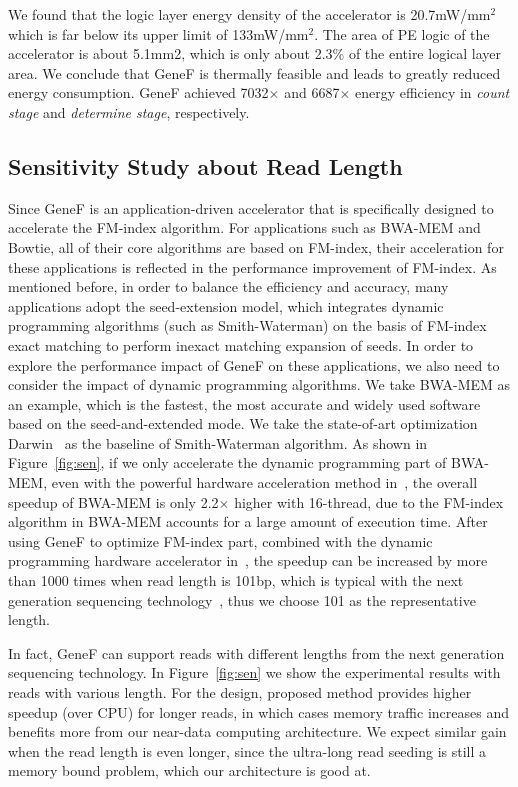 \documentclass[9pt,conference]{IEEEtran}
\begin{document}
We found that the logic layer energy density of the accelerator is 20.7mW/mm$^{2}$ which is far below its upper limit of 133mW/mm$^{2}$. The area of PE logic of the accelerator is about 5.1mm2, which is only about 2.3\% of the entire logical layer area. We conclude that GeneF is thermally feasible and leads to greatly reduced energy consumption. GeneF achieved 7032$\times$ and 6687$\times$ energy efficiency in \textit{count stage} and \textit{determine stage}, respectively.

\subsection{Sensitivity Study about Read Length}
Since GeneF is an application-driven accelerator that is specifically designed to accelerate the FM-index algorithm. For applications such as BWA-MEM and Bowtie, all of their core algorithms are based on FM-index, their acceleration for these applications is reflected in the performance improvement of FM-index. As mentioned before, in order to balance the efficiency and accuracy, many applications adopt the seed-extension model, which integrates dynamic programming algorithms (such as Smith-Waterman) on the basis of FM-index exact matching to perform inexact matching expansion of seeds. In order to explore the performance impact of GeneF on these applications, we also need to consider the impact of dynamic programming algorithms. We take BWA-MEM as an example, which is the fastest, the most accurate and widely used software based on the seed-and-extended mode. We take the state-of-art optimization Darwin~\cite{turakhia2018darwin} as the baseline of Smith-Waterman algorithm. As shown in Figure~\ref{fig:sen}, if we only accelerate the dynamic programming part of BWA-MEM, even with the powerful hardware acceleration method in~\cite{turakhia2018darwin}, the overall speedup of BWA-MEM is only 2.2$\times$ higher with 16-thread, due to the FM-index algorithm in BWA-MEM accounts for a large amount of execution time. After using GeneF to optimize FM-index part, combined with the dynamic programming hardware accelerator in~\cite{turakhia2018darwin}, the speedup can be increased by more than 1000 times when read length is 101bp, which is typical with the next generation sequencing technology~\cite{depristo2011framework, fujiki2018genax}, thus we choose 101 as the representative length. 

In fact, GeneF can support reads with different lengths from the next generation sequencing technology. In Figure~\ref{fig:sen} we show the experimental results with reads with various length. For the design, proposed method provides higher speedup (over CPU) for longer reads, in which cases memory traffic increases and benefits more from our near-data computing architecture. We expect similar gain when the read length is even longer, since the ultra-long read seeding is still a memory bound problem, which our architecture is good at.
\end{document}
